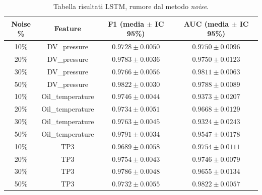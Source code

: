 \documentclass[../main.tex]{subfiles}
\begin{document}
\begin{table}[H]
\centering\small
{}
\begin{tabular}{cccc}
\toprule
\textbf{Noise \%} & \textbf{Feature} & \textbf{F1 (media $\pm$ IC 95\%)} & \textbf{AUC (media $\pm$ IC 95\%)} \\
\midrule
10\% & DV\_pressure     & $0.9728 \pm 0.0050$ & $0.9750 \pm 0.0096$ \\
20\% & DV\_pressure     & $0.9783 \pm 0.0036$ & $0.9750 \pm 0.0123$ \\
30\% & DV\_pressure     & $0.9766 \pm 0.0056$ & $0.9811 \pm 0.0063$ \\
50\% & DV\_pressure     & $0.9822 \pm 0.0030$ & $0.9788 \pm 0.0089$ \\
\midrule
10\% & Oil\_temperature & $0.9746 \pm 0.0044$ & $0.9373 \pm 0.0207$ \\
20\% & Oil\_temperature & $0.9734 \pm 0.0051$ & $0.9668 \pm 0.0129$ \\
30\% & Oil\_temperature & $0.9763 \pm 0.0045$ & $0.9324 \pm 0.0243$ \\
50\% & Oil\_temperature & $0.9791 \pm 0.0034$ & $0.9547 \pm 0.0178$ \\
\midrule
10\% & TP3             & $0.9689 \pm 0.0058$ & $0.9754 \pm 0.0111$ \\
20\% & TP3             & $0.9754 \pm 0.0043$ & $0.9746 \pm 0.0079$ \\
30\% & TP3             & $0.9786 \pm 0.0048$ & $0.9655 \pm 0.0134$ \\
50\% & TP3             & $0.9732 \pm 0.0055$ & $0.9822 \pm 0.0057$ \\
\bottomrule
\end{tabular}
\caption{Tabella risultati LSTM, rumore dal metodo \textit{noise}.}
\label{tab:lstm_noise}
\end{table}
\end{document}
